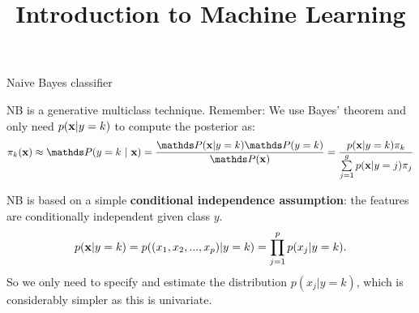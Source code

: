 \documentclass[11pt,compress,t,notes=noshow, xcolor=table]{beamer}
\title{Introduction to Machine Learning}
\begin{document}

\framebreak

\begin{vbframe}{Naive Bayes classifier}

NB is a generative multiclass technique. Remember: We use Bayes' theorem and only need $p(\mathbf{x} | y= k)$ to compute the posterior as:
$$\pikx \approx \postk = \frac{\P(\xv | y = k) \P(y = k)}{\P(\xv)} = \frac{\pdfxyk \pik}{\sumjg \pdfxyk[j] \pi_j} $$


NB is based on a simple \textbf{conditional independence assumption}: the features are conditionally independent given class $y$.
$$
p(\mathbf{x} | y= k) = p((x_1, x_2, ..., x_p)|y = k)=\prod\limits_{j=1}^p p(x_j|y = k).
$$
So we only need to specify and estimate the distribution $p(x_j|y = k)$, which is considerably simpler as this is univariate.

\end{vbframe}
\end{document}
